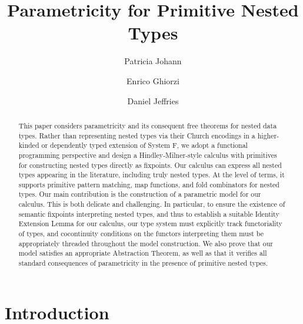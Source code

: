 \documentclass[runningheads]{llncs}
\begin{document}

\title{Parametricity for Primitive Nested Types\vspace*{-0.2in}} 
\author{Patricia Johann \and Enrico Ghiorzi
\and Daniel Jeffries \vspace*{-0.12in}} 

\maketitle

\begin{abstract}

\vspace*{-0.25in}

This paper considers parametricity and its consequent free theorems
for nested data types. Rather than representing nested types via their
Church encodings in a higher-kinded or dependently typed extension of
System F, we adopt a functional programming perspective and design a
Hindley-Milner-style calculus with primitives for constructing nested
types directly as fixpoints. Our calculus can express all nested types
appearing in the literature, including truly nested types. At the
level of terms, it supports primitive pattern matching, map functions,
and fold combinators for nested types. Our main contribution is the
construction of a parametric model for our calculus. This is both
delicate and challenging. In particular, to ensure the existence of
semantic fixpoints interpreting nested types, and thus to establish a
suitable Identity Extension Lemma for our calculus, our type system
must explicitly track functoriality of types, and cocontinuity
conditions on the functors interpreting them must be appropriately
threaded throughout the model construction. We also prove that our
model satisfies an appropriate Abstraction Theorem, as well as that it
verifies all standard consequences of parametricity in the presence of
primitive nested types.
\end{abstract}

\vspace*{-0.4in}

\section{Introduction}\label{sec:intro}
\end{document}
